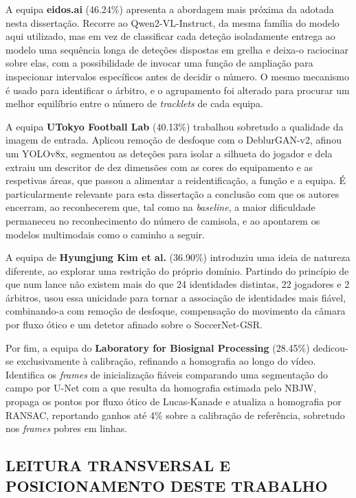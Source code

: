 A equipa \textbf{eidos.ai} (46.24\%) apresenta a abordagem mais próxima da adotada nesta
dissertação. Recorre ao Qwen2-VL-Instruct, da mesma família do modelo aqui utilizado, mas
em vez de classificar cada deteção isoladamente entrega ao modelo uma sequência longa de
deteções dispostas em grelha e deixa-o raciocinar sobre elas, com a possibilidade de invocar
uma função de ampliação para inspecionar intervalos específicos antes de decidir o número.
O mesmo mecanismo é usado para identificar o árbitro, e o agrupamento foi alterado para
procurar um melhor equilíbrio entre o número de \emph{tracklets} de cada equipa.

A equipa \textbf{UTokyo Football Lab} (40.13\%) trabalhou sobretudo a qualidade da imagem
de entrada. Aplicou remoção de desfoque com o DeblurGAN-v2, afinou um YOLOv8x, segmentou
as deteções para isolar a silhueta do jogador e dela extraiu um descritor de dez dimensões
com as cores do equipamento e as respetivas áreas, que passou a alimentar a reidentificação,
a função e a equipa. É particularmente relevante para esta dissertação a conclusão com que
os autores encerram, ao reconhecerem que, tal como na \emph{baseline}, a maior dificuldade
permaneceu no reconhecimento do número de camisola, e ao apontarem os modelos multimodais
como o caminho a seguir.

A equipa de \textbf{Hyungjung Kim et al.} (36.90\%) introduziu uma ideia de natureza
diferente, ao explorar uma restrição do próprio domínio. Partindo do princípio de que num
lance não existem mais do que 24 identidades distintas, 22 jogadores e 2 árbitros, usou
essa unicidade para tornar a associação de identidades mais fiável, combinando-a com
remoção de desfoque, compensação do movimento da câmara por fluxo ótico e um detetor
afinado sobre o SoccerNet-GSR.

Por fim, a equipa do \textbf{Laboratory for Biosignal Processing} (28.45\%) dedicou-se
exclusivamente à calibração, refinando a homografia ao longo do vídeo. Identifica os
\emph{frames} de inicialização fiáveis comparando uma segmentação do campo por U-Net com a
que resulta da homografia estimada pelo NBJW, propaga os pontos por fluxo ótico de
Lucas-Kanade e atualiza a homografia por RANSAC, reportando ganhos até 4\% sobre a
calibração de referência, sobretudo nos \emph{frames} pobres em linhas.

\subsection{LEITURA TRANSVERSAL E POSICIONAMENTO DESTE TRABALHO}

